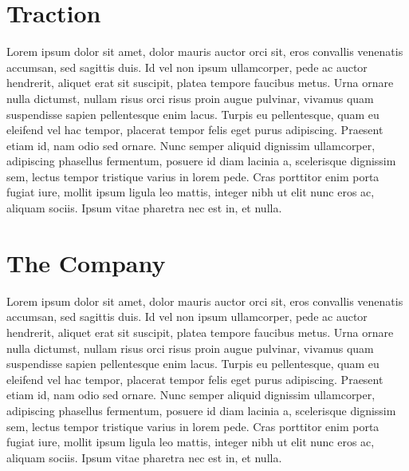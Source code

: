 \documentclass[letterpaper,10pt,openany,oneside,english]{sphinxmanual}
\begin{document}
\section{Traction}
\label{\detokenize{traction:traction}}\label{\detokenize{traction::doc}}
Lorem ipsum dolor sit amet, dolor mauris auctor orci sit, eros convallis venenatis accumsan, sed sagittis duis. Id vel non ipsum ullamcorper, pede ac auctor hendrerit, aliquet erat sit suscipit, platea tempore faucibus metus. Urna ornare nulla dictumst, nullam risus orci risus proin augue pulvinar, vivamus quam suspendisse sapien pellentesque enim lacus. Turpis eu pellentesque, quam eu eleifend vel hac tempor, placerat tempor felis eget purus adipiscing. Praesent etiam id, nam odio sed ornare. Nunc semper aliquid dignissim ullamcorper, adipiscing phasellus fermentum, posuere id diam lacinia a, scelerisque dignissim sem, lectus tempor tristique varius in lorem pede. Cras porttitor enim porta fugiat iure, mollit ipsum ligula leo mattis, integer nibh ut elit nunc eros ac, aliquam sociis. Ipsum vitae pharetra nec est in, et nulla.


\section{The Company}
\label{\detokenize{thecompany:the-company}}\label{\detokenize{thecompany::doc}}
Lorem ipsum dolor sit amet, dolor mauris auctor orci sit, eros convallis venenatis accumsan, sed sagittis duis. Id vel non ipsum ullamcorper, pede ac auctor hendrerit, aliquet erat sit suscipit, platea tempore faucibus metus. Urna ornare nulla dictumst, nullam risus orci risus proin augue pulvinar, vivamus quam suspendisse sapien pellentesque enim lacus. Turpis eu pellentesque, quam eu eleifend vel hac tempor, placerat tempor felis eget purus adipiscing. Praesent etiam id, nam odio sed ornare. Nunc semper aliquid dignissim ullamcorper, adipiscing phasellus fermentum, posuere id diam lacinia a, scelerisque dignissim sem, lectus tempor tristique varius in lorem pede. Cras porttitor enim porta fugiat iure, mollit ipsum ligula leo mattis, integer nibh ut elit nunc eros ac, aliquam sociis. Ipsum vitae pharetra nec est in, et nulla.
\end{document}
